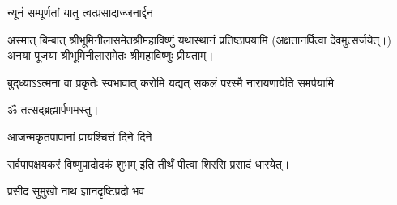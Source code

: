 \begin{center}
{न्यूनं सम्पूर्णतां यातु त्वत्प्रसादाज्जनार्द्दन}\medskip

अस्मात् बिम्बात् श्रीभूमिनीलासमेतश्रीमहाविष्णुं यथास्थानं प्रतिष्ठापयामि (अक्षतानर्पित्वा देवमुत्सर्जयेत्।)\\
अनया पूजया श्रीभूमिनीलासमेतः श्रीमहाविष्णुः प्रीयताम्।\medskip

{बुद्‌ध्याऽऽत्मना वा प्रकृतेः स्वभावात्}
{करोमि यद्यत् सकलं परस्मै}
{नारायणायेति समर्पयामि}


ॐ तत्सद्ब्रह्मार्पणमस्तु।\medskip

{आजन्मकृतपापानां प्रायश्चित्तं दिने दिने}

{सर्वपापक्षयकरं विष्णुपादोदकं शुभम्}
इति तीर्थं पीत्वा शिरसि प्रसादं धारयेत्।

\end{center}


{प्रसीद सुमुखो नाथ ज्ञानदृष्टिप्रदो भव}

\closesection

